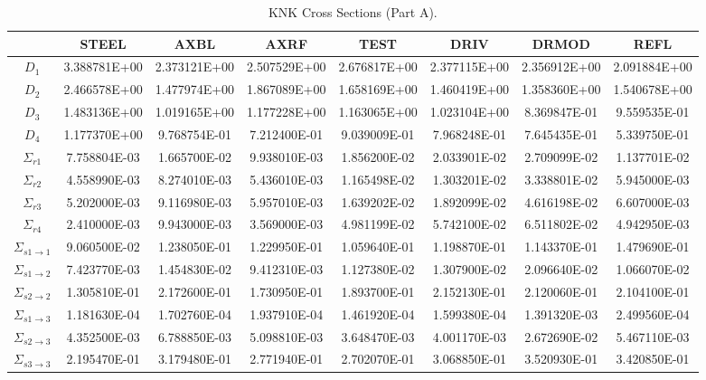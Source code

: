     \begin{landscape}
    \begin{table}
      \caption{KNK Cross Sections (Part A).}
      \label{tab:knkxs_a}
      \begin{center}
        \begin{tabular}{cccccccc}
          \toprule
          &STEEL&AXBL&AXRF&TEST&DRIV&DRMOD&REFL\\
          \midrule
          $D_1$&3.388781E+00&2.373121E+00&2.507529E+00&2.676817E+00&2.377115E+00&2.356912E+00&2.091884E+00\\
          $D_2$&2.466578E+00&1.477974E+00&1.867089E+00&1.658169E+00&1.460419E+00&1.358360E+00&1.540678E+00\\
          $D_3$&1.483136E+00&1.019165E+00&1.177228E+00&1.163065E+00&1.023104E+00&8.369847E-01&9.559535E-01\\
          $D_4$&1.177370E+00&9.768754E-01&7.212400E-01&9.039009E-01&7.968248E-01&7.645435E-01&5.339750E-01\\
          $\Sigma_{r1}$&7.758804E-03&1.665700E-02&9.938010E-03&1.856200E-02&2.033901E-02&2.709099E-02&1.137701E-02\\
          $\Sigma_{r2}$&4.558990E-03&8.274010E-03&5.436010E-03&1.165498E-02&1.303201E-02&3.338801E-02&5.945000E-03\\
          $\Sigma_{r3}$&5.202000E-03&9.116980E-03&5.957010E-03&1.639202E-02&1.892099E-02&4.616198E-02&6.607000E-03\\
          $\Sigma_{r4}$&2.410000E-03&9.943000E-03&3.569000E-03&4.981199E-02&5.742100E-02&6.511802E-02&4.942950E-03\\
          $\Sigma_{s 1\rightarrow 1}$&9.060500E-02&1.238050E-01&1.229950E-01&1.059640E-01&1.198870E-01&1.143370E-01&1.479690E-01\\
          $\Sigma_{s 1\rightarrow 2}$&7.423770E-03&1.454830E-02&9.412310E-03&1.127380E-02&1.307900E-02&2.096640E-02&1.066070E-02\\
          $\Sigma_{s 2\rightarrow 2}$&1.305810E-01&2.172600E-01&1.730950E-01&1.893700E-01&2.152130E-01&2.120060E-01&2.104100E-01\\
          $\Sigma_{s 1\rightarrow 3}$&1.181630E-04&1.702760E-04&1.937910E-04&1.461920E-04&1.599380E-04&1.391320E-03&2.499560E-04\\
          $\Sigma_{s 2\rightarrow 3}$&4.352500E-03&6.788850E-03&5.098810E-03&3.648470E-03&4.001170E-03&2.672690E-02&5.467110E-03\\
          $\Sigma_{s 3\rightarrow 3}$&2.195470E-01&3.179480E-01&2.771940E-01&2.702070E-01&3.068850E-01&3.520930E-01&3.420850E-01\\

\end{tabular}
\end{center}
\end{table}
\end{landscape}
